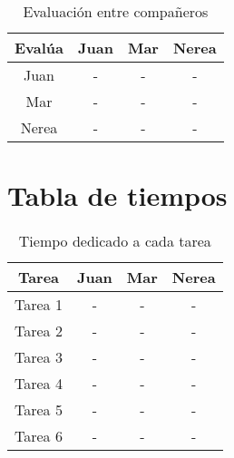 \documentclass[12pt]{article}
\begin{document}
\begin{table}[H]
\centering
\begin{tabular}{|c|c|c|c|}
\hline
\textbf{Evalúa} & \textbf{Juan} & \textbf{Mar} & \textbf{Nerea} \\
\hline
Juan & - & - & - \\
Mar & - & - & - \\
Nerea & - & - & - \\
\hline
\end{tabular}
\caption{Evaluación entre compañeros}
\end{table}

\section{Tabla de tiempos}

\begin{table}[H]
\centering
\begin{tabular}{|c|c|c|c|}
\hline
\textbf{Tarea} & \textbf{Juan} & \textbf{Mar} & \textbf{Nerea} \\
\hline
Tarea 1 & - & - & - \\
Tarea 2 & - & - & - \\
Tarea 3 & - & - & - \\
Tarea 4 & - & - & - \\
Tarea 5 & - & - & - \\
Tarea 6 & - & - & - \\
\hline
\end{tabular}
\caption{Tiempo dedicado a cada tarea}
\end{table}
\end{document}
